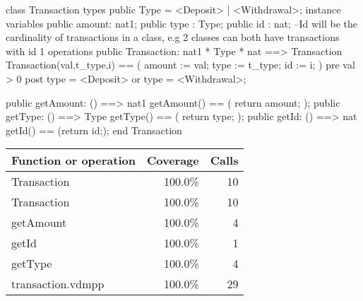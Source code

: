 \documentclass[a4paper]{article}
\begin{document}
\title{}
\author{}
\begin{vdm_al}

class Transaction
types
    public Type = <Deposit> | <Withdrawal>;
instance variables
    public amount: nat1;
    public type : Type; 
    public id : nat; --Id will be the cardinality of transactions in a class, e.g 2 classes can both have transactions with id 1
operations
    public Transaction: nat1 * Type * nat ==> Transaction
    Transaction(val,t_type,i) == (
        amount := val;
        type := t_type;
        id := i;
    )
    pre val > 0
    post type = <Deposit> or type = <Withdrawal>;

    public getAmount: () ==> nat1
    getAmount() == (
        return amount;
    );
    public getType: () ==> Type
    getType() == (
        return type;
    );
    public getId: () ==> nat
    getId() == (return id;);
end Transaction
\end{vdm_al}
\bigskip
\begin{longtable}{|l|r|r|}
\hline
Function or operation & Coverage & Calls \\
\hline
\hline
Transaction & 100.0\% & 10 \\
\hline
Transaction & 100.0\% & 10 \\
\hline
getAmount & 100.0\% & 4 \\
\hline
getId & 100.0\% & 1 \\
\hline
getType & 100.0\% & 4 \\
\hline
\hline
transaction.vdmpp & 100.0\% & 29 \\
\hline
\end{longtable}
\end{document}
